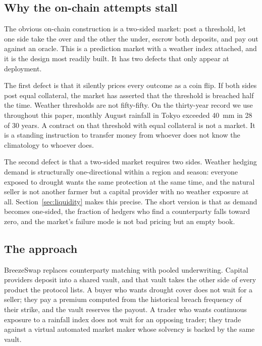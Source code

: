 \documentclass[11pt,a4paper]{article}
\begin{document}
\subsection{Why the on-chain attempts stall}

The obvious on-chain construction is a two-sided market: post a threshold, let one side
take the over and the other the under, escrow both deposits, and pay out against an oracle.
This is a prediction market with a weather index attached, and it is the design most
readily built. It has two defects that only appear at deployment.

The first defect is that it silently prices every outcome as a coin flip. If both sides
post equal collateral, the market has asserted that the threshold is breached half the
time. Weather thresholds are not fifty-fifty. On the thirty-year record we use throughout
this paper, monthly August rainfall in Tokyo exceeded 40~mm in 28 of 30 years. A
contract on that threshold with equal collateral is not a market. It is a standing
instruction to transfer money from whoever does not know the climatology to whoever does.

The second defect is that a two-sided market requires two sides. Weather hedging demand is
structurally one-directional within a region and season: everyone exposed to drought wants
the same protection at the same time, and the natural seller is not another farmer but a
capital provider with no weather exposure at all. Section~\ref{sec:liquidity} makes this
precise. The short version is that as demand becomes one-sided, the fraction of hedgers who
find a counterparty falls toward zero, and the market's failure mode is not bad pricing but
an empty book.

\subsection{The approach}

BreezeSwap replaces counterparty matching with pooled underwriting. Capital providers
deposit into a shared vault, and that vault takes the other side of every product the
protocol lists. A buyer who wants drought cover does not wait for a seller; they pay a
premium computed from the historical breach frequency of their strike, and the vault
reserves the payout. A trader who wants continuous exposure to a rainfall index does not
wait for an opposing trader; they trade against a virtual automated market maker whose
solvency is backed by the same vault.
\end{document}
